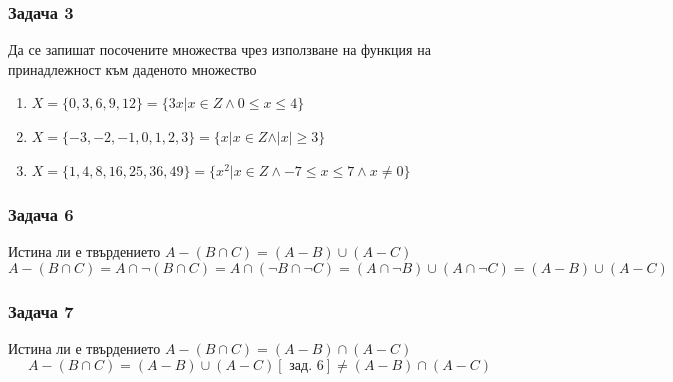 \documentclass[fleqn, 12pt]{article}
\theoremstyle{definition}
\begin{document}
\subsubsection*{Задача 3}
Да  се  запишат  посочените  множества  чрез  използване  на  функция  на принадлежност към даденото множество
\begin{enumerate}
\item $X = \{0,3,6,9,12 \} = \{3x \vert x \in Z  \land 0 \leq x \leq 4 \}$
\item $X = \{-3,-2,-1,0,1,2,3 \} = \{x \vert x \in Z  \land \vert x \vert \geq 3 \}$
\item $X =\{1,4,8,16,25,36,49 \} = \{x^2 \vert x \in Z \land  -7 \leq x \leq 7 \land x \neq 0\}$
\end{enumerate}
\subsubsection*{Задача 6}
Истина ли е твърдението $A - (B \cap C) = (A-B) \cup (A - C)$
$$A - (B \cap C) = A \cap \neg(B \cap C) = A \cap ( \neg B \cap  \neg C) = (A \cap \neg B) \cup (A \cap  \neg C) = (A-B) \cup (A - C)$$
\subsubsection*{Задача 7}
Истина ли е твърдението $A - (B \cap C) = (A-B) \cap (A - C)$
$$A - (B \cap C) = (A-B) \cup (A - C) [\text{ зад. 6}] \neq (A-B) \cap (A - C) $$
\newpage
\end{document}
